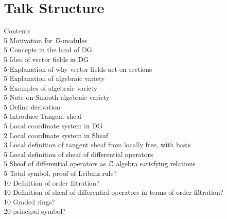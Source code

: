 \documentclass[a4paper]{article}
\begin{document}
\section{Talk Structure}
Contents\\ 5
Motivation for $D$-modules\\ 5
Concepts in the land of DG\\ 5
Idea of vector fields in DG\\ 5
Explanation of why vector fields act on sections\\ 5
Explanation of algebraic variety\\ 5
Examples of algebraic variety\\ 5
Note on Smooth algebraic variety\\ 5
Define derivation\\ 5
Introduce Tangent sheaf\\ 5
Local coordinate system in DG\\ 2
Local coordinate system in Sheaf\\ 3
Local definition of tangent sheaf from locally free, with basis\\ 5
Local definition of sheaf of differential operators\\ 5
Sheaf of differential operators as $\mathbb{C}$ algebra satisfying relations\\ 5
Total symbol, proof of Leibniz rule?\\ 10
Definition of order filtration?\\ 10
Definition of sheaf of differential operators in terms of order filtration?\\ 10
Graded rings?\\ 20
principal symbol?\\
\end{document}
